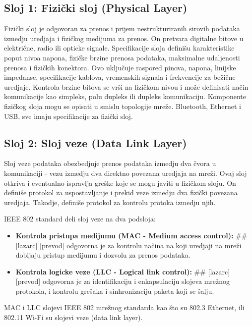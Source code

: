 \documentclass[a4paper,12pt, master]{etf}
\begin{document}
	\subsection{Sloj 1: Fizi\v{c}ki sloj (Physical Layer)}

	Fizi\v{c}ki sloj je odgovoran za prenos i prijem nestrukturiranih sirovih podataka izmedju 
	uredjaja i fizi\v{c}kog medijuma za prenos. On pretvara digitalne bitove u elektri\v{c}ne, radio 
	ili opticke signale. Specifikacije sloja defini\v{s}u karakteristike poput nivoa napona, 
	fizi\v{c}ke brzine prenosa podataka, maksimalne udaljenosti prenosa i fizi\v{c}kih konektora. Ovo 
	uklju\v{c}uje raspored pinova, napona, linijske impedanse, specifikacije kablova, vremenskih 
	signala i frekvencije za be\v{z}i\v{c}ne uredjaje. Kontrola brzine bitova se vr\v{s}i na fizi\v{c}kom 
	nivou i mo\v{z}e definisati na\v{c}in komunikacije kao simpleks, polu dupleks ili dupleks 
	komunikaciju. Komponente fizi\v{c}kog sloja mogu se opisati u smislu topologije mre\v{z}e. 
	Bluetooth, Ethernet i USB, sve imaju specifikacije za fizi\v{c}ki sloj.

	\subsection{Sloj 2: Sloj veze (Data Link Layer)}

	Sloj veze podataka obezbedjuje prenos podataka izmedju dva \v{c}vora u komunikaciji - vezu 
	izmedju dva direktno povezana uredjaja na mre\v{z}i. Ovaj sloj otkriva i eventualno ispravlja 
	gre\v{s}ke koje se mogu javiti u fizi\v{c}kom sloju. On defini\v{s}e protokol za uspostavljanje i 
	prekid veze izmedju dva fizi\v{c}ki povezana uredjaja. Takodje, defini\v{s}e protokol za kontrolu 
	protoka izmedju njih.

	IEEE 802 standard deli sloj veze na dva podsloja:
	\begin{itemize}
		\item \textbf{Kontrola pristupa medijumu (MAC - Medium access control):}
		\#\# [lazarc] [prevod]
		odgovorna je za kontrolu na\v{c}ina na koji uredjaji na mre\v{z}i dobijaju pristup medijumu i
		dozvolu za prenos podataka.
		\item \textbf{Kontrola logicke veze (LLC - Logical link control):}
		\#\# [lazarc] [prevod]
		odgovorna je za identifikaciju i enkapsulaciju slojeva mre\v{z}nog protokola, i kontrolu
		gre\v{s}aka i sinhronizaciju paketa koji se \v{s}alju.
	\end{itemize}

	MAC i LLC slojevi IEEE 802 mre\v{z}nog standarda kao \v{s}to su 802.3 Ethernet, ili 802.11 Wi-Fi su
	slojevi veze (data link layer).
\end{document}
